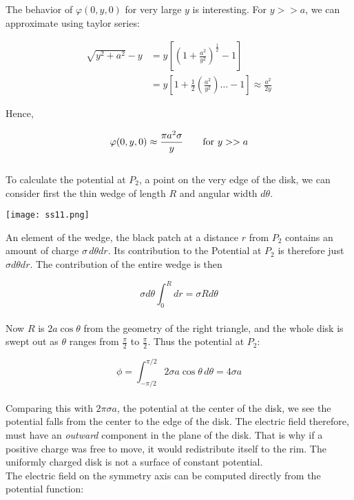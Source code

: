 \documentclass[svgnames]{article}
\begin{document}
The behavior of $\varphi (0, y, 0)$ for very large $y$ is interesting. For
$ y >> a$, we can approximate using taylor series:

\begin{align*} \sqrt{y^2 + a^2} - y &= y \left[\left(1+\frac{a^2}{y^2}\right)^\frac{1}{2} - 1 \right] \\
&= y \left[1 + \frac{1}{2} \left(\frac{a^2}{y^2}\right) \dots - 1 \right] \approx \frac{a^2}{2y} 
\end{align*}

Hence, 

\[ \varphi(0, y, 0) \approx \frac{\pi a^2 \sigma}{y} \hspace{20px} \text{for $y >> a$} \] \\ 

To calculate the potential at $P_2$, a point on the very edge of the disk, we
can consider first the thin wedge of length $R$ and angular width $d\theta$. 

\begin{center}
\texttt{[image: ss11.png]}
\end{center} 

An element of the wedge, the black patch at a distance $r$ from $P_2$ contains
an amount of charge $\sigma \, d\theta dr$. Its contribution to the Potential
at $P_2$ is therefore just $\sigma d\theta dr$. The contribution of the entire
wedge is then

\[ \sigma d\theta \int_0^R dr = \sigma R d\theta \]\\

Now $R$ is $2a\cos\theta$ from the geometry of the right triangle, and the
whole disk is swept out as $\theta$ ranges from $\frac{\pi}{2}$ to
$\frac{\pi}{2}$. Thus the potential at $P_2$:

\[ \phi = \int_{-\pi / 2}^{\pi / 2} 2\sigma a \cos \theta \, d\theta = 4\sigma a \] \\

Comparing this with $2\pi \sigma a$, the potential at the center of the disk,
we see the potential falls from the center to the edge of the disk. The
electric field therefore, must have an \textit{outward} component in the plane
of the disk. That is why if a positive charge was free to move, it would
redistribute itself to the rim. The uniformly charged disk is not a surface of
constant potential. \\

The electric field on the symmetry axis can be computed directly from the potential function: 
\end{document}
